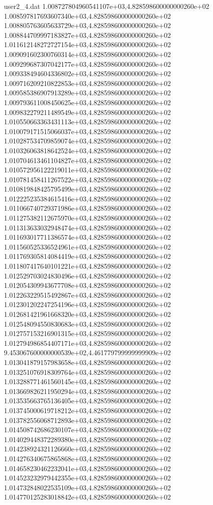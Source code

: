 \begin{filecontents}{user2_4.dat}
1.008727804960541107e+03,4.828598600000000260e+02
1.008597817693607340e+03,4.828598600000000260e+02
1.008805763605633729e+03,4.828598600000000260e+02
1.008844709997183827e+03,4.828598600000000260e+02
1.011612148272727154e+03,4.828598600000000260e+02
1.009091602300760314e+03,4.828598600000000260e+02
1.009299687307042177e+03,4.828598600000000260e+02
1.009338494604336802e+03,4.828598600000000260e+02
1.009716209210822853e+03,4.828598600000000260e+02
1.009585386907913289e+03,4.828598600000000260e+02
1.009793611008450625e+03,4.828598600000000260e+02
1.009832279211489549e+03,4.828598600000000260e+02
1.010550663363431113e+03,4.828598600000000260e+02
1.010079171515066037e+03,4.828598600000000260e+02
1.010287534709859074e+03,4.828598600000000260e+02
1.010326063818642524e+03,4.828598600000000260e+02
1.010704613461104827e+03,4.828598600000000260e+02
1.010572956122219011e+03,4.828598600000000260e+02
1.010781458411267522e+03,4.828598600000000260e+02
1.010819848425795499e+03,4.828598600000000260e+02
1.012225235384615416e+03,4.828598600000000260e+02
1.011066740729371986e+03,4.828598600000000260e+02
1.011275382112675970e+03,4.828598600000000260e+02
1.011313633032948474e+03,4.828598600000000260e+02
1.011693017711386574e+03,4.828598600000000260e+02
1.011560525336524961e+03,4.828598600000000260e+02
1.011769305814084419e+03,4.828598600000000260e+02
1.011807417640101221e+03,4.828598600000000260e+02
1.012529703024830496e+03,4.828598600000000260e+02
1.012054309943677708e+03,4.828598600000000260e+02
1.012263229515492867e+03,4.828598600000000260e+02
1.012301202247254196e+03,4.828598600000000260e+02
1.012681421961668320e+03,4.828598600000000260e+02
1.012548094550830683e+03,4.828598600000000260e+02
1.012757153216901315e+03,4.828598600000000260e+02
1.012794986854407171e+03,4.828598600000000260e+02
9.453067600000000539e+02,4.461779799999999909e+02
1.013041879157983658e+03,4.828598600000000260e+02
1.013251076918309764e+03,4.828598600000000260e+02
1.013288771461560145e+03,4.828598600000000260e+02
1.013669826211950294e+03,4.828598600000000260e+02
1.013535663765136405e+03,4.828598600000000260e+02
1.013745000619718212e+03,4.828598600000000260e+02
1.013782556068712893e+03,4.828598600000000260e+02
1.014508742686230107e+03,4.828598600000000260e+02
1.014029448372289380e+03,4.828598600000000260e+02
1.014238924321126660e+03,4.828598600000000260e+02
1.014276340675865868e+03,4.828598600000000260e+02
1.014658230462232041e+03,4.828598600000000260e+02
1.014523232979442355e+03,4.828598600000000260e+02
1.014732848022535109e+03,4.828598600000000260e+02
1.014770125283018842e+03,4.828598600000000260e+02

\end{filecontents}

